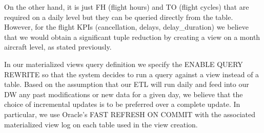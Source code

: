 \documentclass{article} %
\begin{document}
On the other hand, it is just FH (flight hours) and TO (flight cycles) that are required on a daily level but they can be queried directly from the table. However, for the flight KPIs (cancellation, delays, delay\_duration) we believe that we would obtain a significant tuple reduction by creating a view on a month aircraft level, as stated previously.

In our materialized views query definition we specify the ENABLE QUERY REWRITE so that the system decides to run a query against a view instead of a table. Based on the assumption that our ETL will run daily and feed into our DW any past modifications or new data for a given day, we believe that the choice of incremental updates is to be preferred over a complete update. In particular, we use Oracle's FAST REFRESH ON COMMIT with the associated materialized view log on each table used in the view creation.
\end{document}
